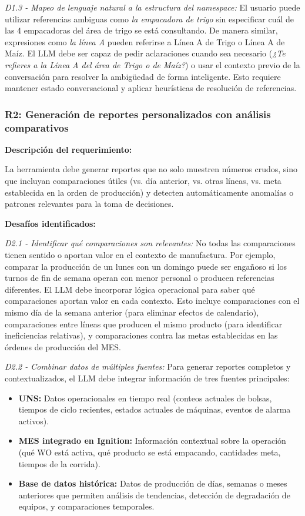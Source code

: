 \label{des:D1.3}
\textit{D1.3 - Mapeo de lenguaje natural a la estructura del namespace:} El usuario puede utilizar referencias ambiguas como \textit{la empacadora de trigo} sin especificar cuál de las 4 empacadoras del área de trigo se está consultando. De manera similar, expresiones como \textit{la línea A} pueden referirse a Línea A de Trigo o Línea A de Maíz. El LLM debe ser capaz de pedir aclaraciones cuando sea necesario (\textit{¿Te refieres a la Línea A del área de Trigo o de Maíz?}) o usar el contexto previo de la conversación para resolver la ambigüedad de forma inteligente. Esto requiere mantener estado conversacional y aplicar heurísticas de resolución de referencias.

\subsubsection{R2: Generación de reportes personalizados con análisis comparativos}
\label{req:R2}

\textbf{Descripción del requerimiento:}

La herramienta debe generar reportes que no solo muestren números crudos, sino que incluyan comparaciones útiles (vs. día anterior, vs. otras líneas, vs. meta establecida en la orden de producción) y detecten automáticamente anomalías o patrones relevantes para la toma de decisiones.

\textbf{Desafíos identificados:}

\label{des:D2.1}
\textit{D2.1 - Identificar qué comparaciones son relevantes:} No todas las comparaciones tienen sentido o aportan valor en el contexto de manufactura. Por ejemplo, comparar la producción de un lunes con un domingo puede ser engañoso si los turnos de fin de semana operan con menor personal o producen referencias diferentes. El LLM debe incorporar lógica operacional para saber qué comparaciones aportan valor en cada contexto. Esto incluye comparaciones con el mismo día de la semana anterior (para eliminar efectos de calendario), comparaciones entre líneas que producen el mismo producto (para identificar ineficiencias relativas), y comparaciones contra las metas establecidas en las órdenes de producción del MES.

\label{des:D2.2}
\textit{D2.2 - Combinar datos de múltiples fuentes:} Para generar reportes completos y contextualizados, el LLM debe integrar información de tres fuentes principales:

\begin{itemize}
    \item \textbf{UNS:} Datos operacionales en tiempo real (conteos actuales de bolsas, tiempos de ciclo recientes, estados actuales de máquinas, eventos de alarma activos).
    \item \textbf{MES integrado en Ignition:} Información contextual sobre la operación (qué WO está activa, qué producto se está empacando, cantidades meta, tiempos de la corrida).
    \item \textbf{Base de datos histórica:} Datos de producción de días, semanas o meses anteriores que permiten análisis de tendencias, detección de degradación de equipos, y comparaciones temporales.
\end{itemize}

